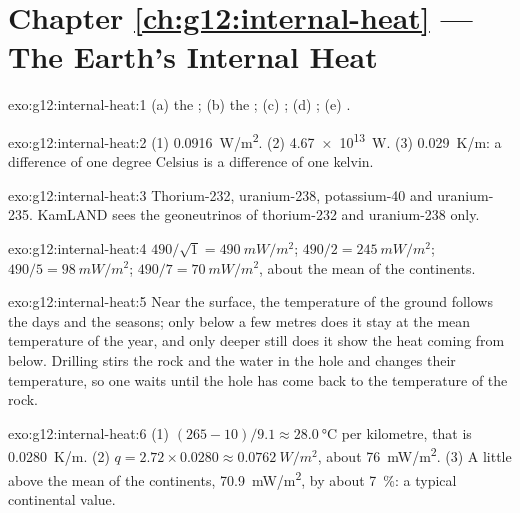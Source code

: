 \section*{Chapter \ref{ch:g12:internal-heat} --- The Earth's Internal Heat}

\begin{solution}{exo:g12:internal-heat:1}
(a) the ; (b) the ; (c) ;
(d) ; (e) .
\end{solution}

\begin{solution}{exo:g12:internal-heat:2}
(1) \qty{0.0916}{W/m^2}. (2) \qty{4.67e13}{W}. (3) \qty{0.029}{K/m}: a
difference of one degree Celsius is a difference of one kelvin.
\end{solution}

\begin{solution}{exo:g12:internal-heat:3}
Thorium-232, uranium-238, potassium-40 and uranium-235. KamLAND sees the
geoneutrinos of thorium-232 and uranium-238 only.
\end{solution}

\begin{solution}{exo:g12:internal-heat:4}
$490/\sqrt{1} = \qty{490}{mW/m^2}$; $490/2 = \qty{245}{mW/m^2}$;
$490/5 = \qty{98}{mW/m^2}$; $490/7 = \qty{70}{mW/m^2}$, about the mean of the
continents.
\end{solution}

\begin{solution}{exo:g12:internal-heat:5}
Near the surface, the temperature of the ground follows the days and the
seasons; only below a few metres does it stay at the mean temperature of the
year, and only deeper still does it show the heat coming from below.
Drilling stirs the rock and the water in the hole and changes their
temperature, so one waits until the hole has come back to the temperature of
the rock.
\end{solution}

\begin{solution}{exo:g12:internal-heat:6}
(1) $(265 - 10)/9.1 \approx \qty{28.0}{\celsius}$ per kilometre, that is
\qty{0.0280}{K/m}. (2) $q = 2.72 \times 0.0280 \approx \qty{0.0762}{W/m^2}$,
about \qty{76}{mW/m^2}. (3) A little above the mean of the continents,
\qty{70.9}{mW/m^2}, by about \qty{7}{\percent}: a typical continental value.
\end{solution}

